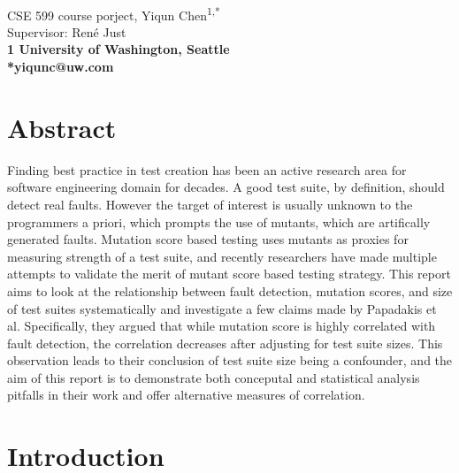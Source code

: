 \documentclass[10pt,letterpaper]{article}
\begin{document}
\vspace*{0.35in}

\begin{flushleft}
{\Large
\textbf{}
}
\newline
\\
CSE 599 course porject, Yiqun Chen\textsuperscript{1,*}\\
Supervisor: Ren\'e Just \\

\bigskip
\bf{1} University of Washington, Seattle
\\
\bigskip
*yiqunc@uw.com
\end{flushleft}



\section*{Abstract}
Finding best practice in test creation has been an active research area for software engineering domain for decades. A good test suite, by definition, should detect real faults. However the target of interest is usually unknown to the programmers a priori, which prompts the use of mutants, which are artifically generated faults. Mutation score based testing uses mutants as proxies for measuring strength of a test suite, and recently researchers have made multiple attempts to validate the merit of mutant score based testing strategy. This report aims to look at the relationship between fault detection, mutation scores, and size of test suites systematically and investigate a few claims made by Papadakis et al. Specifically, they argued that while mutation score is highly correlated with fault detection, the correlation decreases after adjusting for test suite sizes. This observation leads to their conclusion of test suite size being a confounder, and the aim of this report is to demonstrate both conceputal and statistical analysis pitfalls in their work and offer alternative measures of correlation.




\section{Introduction}
\end{document}

